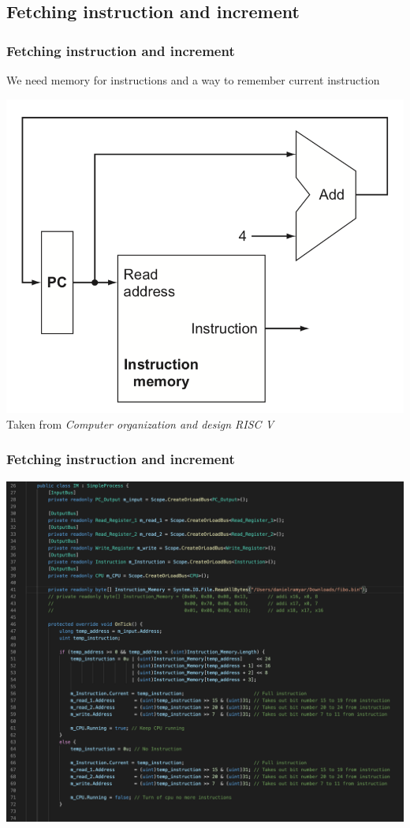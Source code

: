 \documentclass{beamer}
\begin{document}
    \begin{frame}
        \subsection{Fetching instruction and increment}
        \frametitle{Fetching instruction and increment}
        \centering
        \vspace{-0.5cm}
        We need memory for instructions and a way to remember current instruction

        \includegraphics[scale=0.4]{"Pictures and plots/IFINC"} \\
        \scriptsize{Taken from \textit{Computer organization and design RISC V}}
        
    \end{frame}

    \begin{frame}
        \frametitle{Fetching instruction and increment}
        \centering
        \vspace{-0.2cm}
        
        \includegraphics[scale=0.23]{"Pictures and plots/SMEINS"}
        
    \end{frame}
\end{document}
